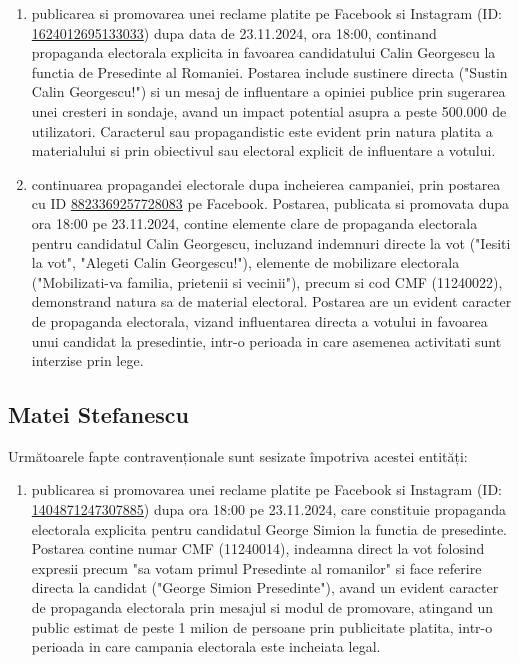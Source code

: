 \documentclass[a4paper,12pt]{article}
\begin{document}
\begin{enumerate}[leftmargin=*, label=\arabic*.)]
    \item publicarea si promovarea unei reclame platite pe Facebook si Instagram (ID: \href{https://www.facebook.com/ads/library/?id=1624012695133033}{1624012695133033}) dupa data de 23.11.2024, ora 18:00, continand propaganda electorala explicita in favoarea candidatului Calin Georgescu la functia de Presedinte al Romaniei. Postarea include sustinere directa ("Sustin Calin Georgescu!") si un mesaj de influentare a opiniei publice prin sugerarea unei cresteri in sondaje, avand un impact potential asupra a peste 500.000 de utilizatori. Caracterul sau propagandistic este evident prin natura platita a materialului si prin obiectivul sau electoral explicit de influentare a votului.
    \item continuarea propagandei electorale dupa incheierea campaniei, prin postarea cu ID \href{https://www.facebook.com/ads/library/?id=8823369257728083}{8823369257728083} pe Facebook. Postarea, publicata si promovata dupa ora 18:00 pe 23.11.2024, contine elemente clare de propaganda electorala pentru candidatul Calin Georgescu, incluzand indemnuri directe la vot ("Iesiti la vot", "Alegeti Calin Georgescu!"), elemente de mobilizare electorala ("Mobilizati-va familia, prietenii si vecinii"), precum si cod CMF (11240022), demonstrand natura sa de material electoral. Postarea are un evident caracter de propaganda electorala, vizand influentarea directa a votului in favoarea unui candidat la presedintie, intr-o perioada in care asemenea activitati sunt interzise prin lege.
\end{enumerate}

\vspace{0.5cm}

\subsection{Matei Stefanescu}
Următoarele fapte contravenționale sunt sesizate împotriva acestei entități:

\begin{enumerate}[leftmargin=*, label=\arabic*.)]
    \item publicarea si promovarea unei reclame platite pe Facebook si Instagram (ID: \href{https://www.facebook.com/ads/library/?id=1404871247307885}{1404871247307885}) dupa ora 18:00 pe 23.11.2024, care constituie propaganda electorala explicita pentru candidatul George Simion la functia de presedinte. Postarea contine numar CMF (11240014), indeamna direct la vot folosind expresii precum "sa votam primul Presedinte al romanilor" si face referire directa la candidat ("George Simion Presedinte"), avand un evident caracter de propaganda electorala prin mesajul si modul de promovare, atingand un public estimat de peste 1 milion de persoane prin publicitate platita, intr-o perioada in care campania electorala este incheiata legal.
\end{enumerate}
\end{document}
